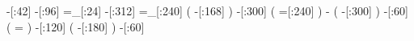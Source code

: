       -[:42]%
      -[:96]%
     =_[:24]%
     -[:312]%
    =_[:240]%
               (
         -[:168]\phantom{N}%
               )
     -[:300]%
               (
         =[:240]%
               )
           -%
               (
         -[:300]%
               )
      -[:60]%
               (
               =%
               )
     -[:120]%
               (
         -[:180]\phantom{5}%
               )
      -[:60]%